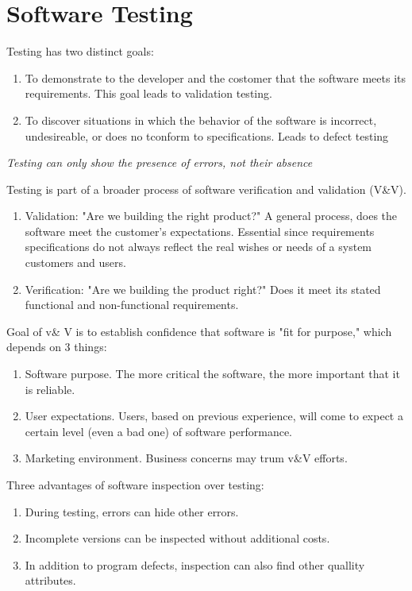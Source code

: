 \documentclass{article}
\begin{document}
 
\setcounter{section}{7}
\section{Software Testing}
Testing has two distinct goals:
\begin{enumerate}
    \item To demonstrate to the developer and the costomer that the software meets its requirements.
        This goal leads to validation testing.
    \item To discover situations in which the behavior of the software is incorrect, undesireable, or does no tconform to specifications.
        Leads to defect testing
\end{enumerate}
\Large
\textit{Testing can only show the presence of errors, not their absence}
\normalsize

Testing is part of a broader process of software verification and validation (V\&V).
\begin{enumerate}
    \item Validation: "Are we building the right product?"
        A general process, does the software meet the customer's expectations.  Essential since requirements specifications do not always reflect the real wishes or needs of a system customers and users.
    \item Verification: "Are we building the product right?"
        Does it meet its stated functional and non-functional requirements.
\end{enumerate}
Goal of v\& V is to establish confidence that software is "fit for purpose," which depends on 3 things:
\begin{enumerate}
    \item Software purpose.  The more critical the software, the more important that it is reliable.
    \item User expectations.  Users, based on previous experience, will come to expect a certain level (even a bad one) of software performance.
    \item Marketing environment.  Business concerns may trum v\&V efforts.
\end{enumerate}

Three advantages of software inspection over testing:
\begin{enumerate}
    \item During testing, errors can hide other errors.
    \item Incomplete versions can be inspected without additional costs.
    \item In addition to program defects, inspection can also find other quallity attributes.
\end{enumerate}
\end{document}
